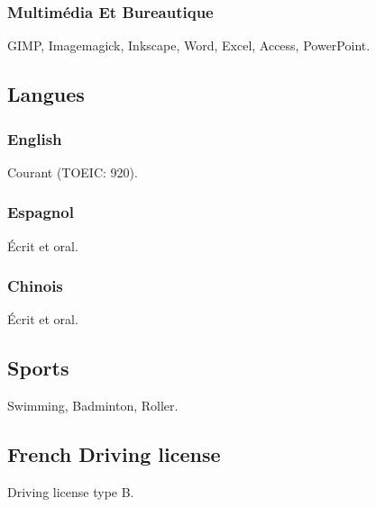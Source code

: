 \documentclass{article}
\begin{document}
\begin{multicols}{2}
                \subsubsection{Multim\'edia Et Bureautique}
                    GIMP, Imagemagick, Inkscape, Word, Excel, Access, PowerPoint.
            \subsection{Langues}
                \subsubsection{English}
                    Courant (TOEIC: 920).
                \subsubsection{Espagnol}
                    \'Ecrit et oral.
                \subsubsection{Chinois}
                    \'Ecrit et oral.
                \subsection{Sports}
                    Swimming, Badminton, Roller.
                \subsection{French Driving license}
                 Driving license type B.
    \end{multicols}
\end{document}
